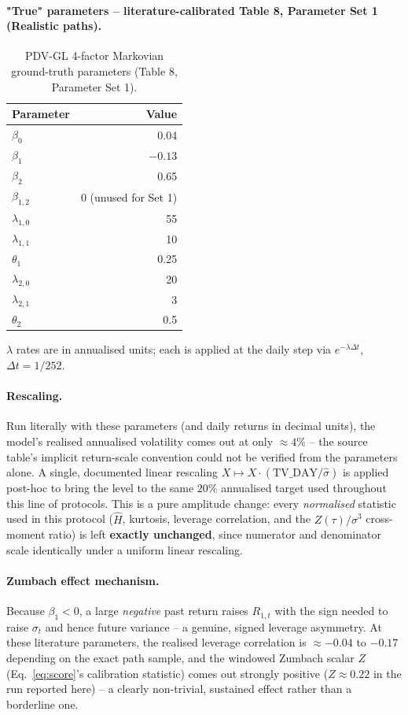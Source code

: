 \documentclass[11pt,a4paper]{article}
\begin{document}
\paragraph{"True" parameters -- literature-calibrated Table 8,
Parameter Set 1 (Realistic paths).}
\begin{table}[H]
\centering
\caption{PDV-GL 4-factor Markovian ground-truth parameters (Table 8, Parameter Set 1).}
\label{tab:pdvgl4f}
\begin{tabular}{@{}lr@{}}
\toprule
Parameter & Value \\
\midrule
$\beta_0$ & 0.04 \\
$\beta_1$ & $-0.13$ \\
$\beta_2$ & 0.65 \\
$\beta_{1,2}$ & 0 (unused for Set 1) \\
$\lambda_{1,0}$ & 55 \\
$\lambda_{1,1}$ & 10 \\
$\theta_1$ & 0.25 \\
$\lambda_{2,0}$ & 20 \\
$\lambda_{2,1}$ & 3 \\
$\theta_2$ & 0.5 \\
\bottomrule
\end{tabular}
\end{table}
$\lambda$ rates are in annualised units; each is applied at the daily
step via $e^{-\lambda\Delta t}$, $\Delta t=1/252$.

\paragraph{Rescaling.}
Run literally with these parameters (and daily returns in decimal
units), the model's realised annualised volatility comes out at only
$\approx4\%$ -- the source table's implicit return-scale convention
could not be verified from the parameters alone. A single, documented
linear rescaling $X\mapsto X\cdot(\mathrm{TV\_DAY}/\widehat\sigma)$ is
applied post-hoc to bring the level to the same $20\%$ annualised target
used throughout this line of protocols. This is a pure amplitude change:
every \emph{normalised} statistic used in this protocol ($\hat H$,
kurtosis, leverage correlation, and the $Z(\tau)/\sigma^3$ cross-moment
ratio) is left \textbf{exactly unchanged}, since numerator and
denominator scale identically under a uniform linear rescaling.

\paragraph{Zumbach effect mechanism.}
Because $\beta_1<0$, a large \emph{negative} past return raises
$R_{1,t}$ with the sign needed to raise $\sigma_t$ and hence future
variance -- a genuine, signed leverage asymmetry. At these literature
parameters, the realised leverage correlation is $\approx-0.04$ to
$-0.17$ depending on the exact path sample, and the windowed Zumbach
scalar $Z$ (Eq.~\ref{eq:score}'s calibration statistic) comes out
strongly positive ($Z\approx0.22$ in the run reported here) -- a
clearly non-trivial, sustained effect rather than a borderline one.
\end{document}
